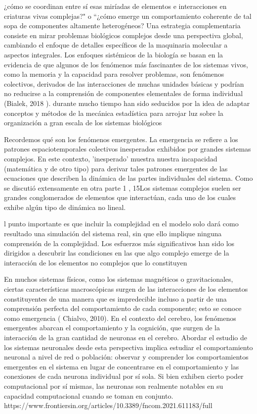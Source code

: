 ¿cómo se coordinan entre sí esas miríadas de elementos e interacciones en criaturas vivas complejas?" o “¿cómo emerge un comportamiento coherente de tal sopa de componentes altamente heterogéneos? Una estrategia complementaria consiste en mirar problemas biológicos complejos desde una perspectiva global, cambiando el enfoque de detalles específicos de la maquinaria molecular a aspectos integrales.  Los enfoques sistémicos de la biología se basan en la evidencia de que algunos de los fenómenos más fascinantes de los sistemas vivos, como la memoria y la capacidad para resolver problemas, son fenómenos colectivos, derivados de las interacciones de muchas unidades básicas y podrían no reducirse a la comprensión de componentes elementales de forma individual (Bialek, 2018 ).  durante mucho tiempo han sido seducidos por la idea de adaptar conceptos y métodos de la mecánica estadística para arrojar luz sobre la organización a gran escala de los sistemas biológicos

Recordemos qué son los fenómenos emergentes. La emergencia se refiere a los patrones espaciotemporales colectivos inesperados exhibidos por grandes sistemas complejos. En este contexto, 'inesperado' muestra nuestra incapacidad (matemática y de otro tipo) para derivar tales patrones emergentes de las ecuaciones que describen la dinámica de las partes individuales del sistema. Como se discutió extensamente en otra parte 1 , 15Los sistemas complejos suelen ser grandes conglomerados de elementos que interactúan, cada uno de los cuales exhibe algún tipo de dinámica no lineal.


l punto importante es que incluir la complejidad en el modelo solo dará como resultado una simulación del sistema real, sin que ello implique ninguna comprensión de la complejidad. Los esfuerzos más significativos han sido los dirigidos a descubrir las condiciones en las que algo complejo emerge de la interacción de los elementos no complejos que lo constituyen


En muchos sistemas físicos, como los sistemas magnéticos o gravitacionales, ciertas características macroscópicas surgen de las interacciones de los elementos constituyentes de una manera que es impredecible incluso a partir de una comprensión perfecta del comportamiento de cada componente; esto se conoce como emergencia ( Chialvo, 2010). En el contexto del cerebro, los fenómenos emergentes abarcan el comportamiento y la cognición, que surgen de la interacción de la gran cantidad de neuronas en el cerebro. Abordar el estudio de los sistemas neuronales desde esta perspectiva implica estudiar el comportamiento neuronal a nivel de red o población: observar y comprender los comportamientos emergentes en el sistema en lugar de concentrarse en el comportamiento y las conexiones de cada neurona individual por sí sola. Si bien exhiben cierto poder computacional por sí mismas, las neuronas son realmente notables en su capacidad computacional cuando se toman en conjunto.
https://www.frontiersin.org/articles/10.3389/fncom.2021.611183/full




